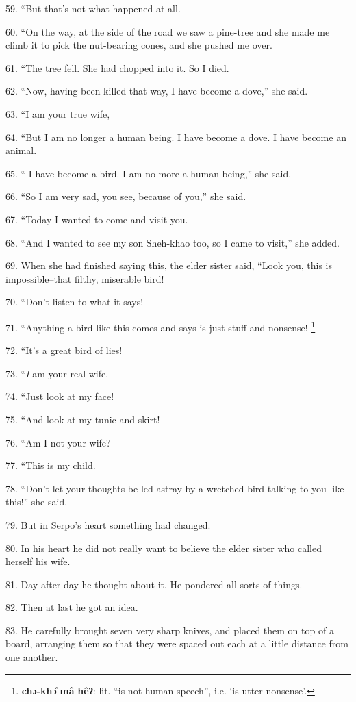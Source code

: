 59. ``But that's not what happened at all.

60. ``On the way, at the side of the road we saw a pine-tree and she made
me climb it to pick the nut-bearing cones, and she pushed me over.

61. ``The tree fell. She had chopped into it. So I died.

62. ``Now, having been killed that way, I have become a dove,''
she said.

63. ``I am your true wife,

64. ``But I am no longer a human being. I have become a dove. I have become
an animal.

65. `` I have become a bird. I am no more a human being,'' she
said.

66. ``So I am very sad, you see, because of you,'' she said.

67. ``Today I wanted to come and visit you.

68. ``And I wanted to see my son Sheh-khao too, so I came to visit,''
she added.

69. When she had finished saying this, the elder sister said, ``Look you,
this is impossible--that filthy, miserable bird!

70. ``Don't listen to what it says!

71. ``Anything a bird like this comes and says is just stuff and nonsense!
\footnote{\textbf{chɔ-khɔ̂} \textbf{mâ} \textbf{hêʔ}: lit. ``is not human speech'', i.e. `is utter nonsense'.}

72. ``It's a great bird of lies!

73. ``\textit{I} am your real wife.

74. ``Just look at my face!

75. ``And look at my tunic and skirt!

76. ``Am I not your wife?

77. ``This is my child.

78. ``Don't let your thoughts be led astray by a wretched bird talking
to you like this!'' she said.

79. But in Serpo's heart something had changed.

80. In his heart he did not really want to believe the elder sister who called
herself his wife.

81. Day after day he thought about it. He pondered all sorts of things.

82. Then at last he got an idea.

83. He carefully brought seven very sharp knives, and placed them on top of a board,
arranging them so that they were spaced out each at a little distance from one
another.

